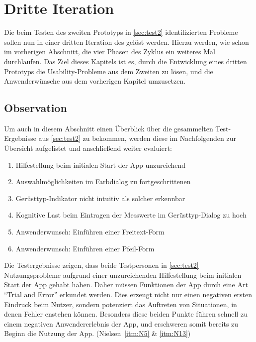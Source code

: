\chapter{Dritte Iteration}\label{chap:pro3}
Die beim Testen des zweiten Prototyps in \autoref{sec:test2} identifizierten Probleme sollen nun in einer dritten Iteration des \hcdp{} gelöst werden.
Hierzu werden, wie schon im vorherigen Abschnitt, die vier Phasen des Zyklus ein weiteres Mal durchlaufen.
Das Ziel dieses Kapitels ist es, durch die Entwicklung eines dritten Prototyps die Usability-Probleme aus dem Zweiten zu lösen, und die Anwenderwünsche aus dem vorherigen Kapitel umzusetzen.

\section{Observation}\label{sec:obs3}
Um auch in diesem Abschnitt einen Überblick über die gesammelten Test-Ergebnisse aus \autoref{sec:test2} zu bekommen, werden diese im Nachfolgenden zur Übersicht aufgelistet und anschließend weiter evaluiert:

\begin{enumerate}
  \item Hilfestellung beim initialen Start der App unzureichend
  \item Auswahlmöglichkeiten im Farbdialog zu fortgeschrittenen
  \item Gerüsttyp-Indikator nicht intuitiv als solcher erkennbar
  \item Kognitive Last beim Eintragen der Messwerte im Gerüsttyp-Dialog zu hoch
  \item Anwenderwunsch: Einführen einer Freitext-Form
  \item Anwenderwunsch: Einführen einer Pfeil-Form 
\end{enumerate}

\noindent
Die Testergebnisse zeigen, dass beide Testpersonen in \autoref{sec:test2} Nutzungsprobleme aufgrund einer unzureichenden Hilfestellung beim initialen Start der App gehabt haben.
Daher müssen Funktionen der App durch eine Art ``Trial and Error'' erkundet werden.
Dies erzeugt nicht nur einen negativen ersten Eindruck beim Nutzer, sondern potenziert das Auftreten von Situationen, in denen Fehler enstehen können.
Besonders diese beiden Punkte führen schnell zu einem negativen Anwendererlebnis der App, und erschweren somit bereits zu Beginn die Nutzung der App.
(Nielsen~\autoref{itm:N5} \& \autoref{itm:N13}) \\

